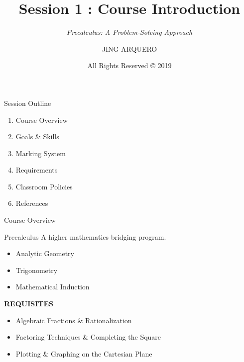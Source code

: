 \documentclass[14pt,aspectratio=169]{beamer}
\begin{document}
\title{Session 1 : Course Introduction}
\subtitle{\textit{Precalculus: A Problem-Solving Approach}}
\author{JING ARQUERO}
\date{All Rights Reserved {\textrm{\copyright}} 2019}

\begin{frame}
 \maketitle
\end{frame}

\begin{frame}{Session Outline}
 \begin{enumerate}
  \item Course Overview
  \item Goals \& Skills
  \item Marking System
  \item Requirements
  \item Classroom Policies
  \item References
 \end{enumerate}

\end{frame}



\begin{frame}{Course Overview}
 \begin{block}{Precalculus}
 A higher mathematics bridging program.
  \begin{itemize}
   \item Analytic Geometry
   \item Trigonometry
   \item Mathematical Induction
  \end{itemize}
 \end{block}

 \textbf{REQUISITES}
 \begin{itemize}
  \item Algebraic Fractions \& Rationalization
  \item Factoring Techniques \& Completing the Square
  \item Plotting \& Graphing on the Cartesian Plane
 \end{itemize}


\end{frame}
\end{document}
